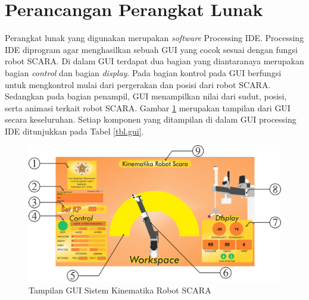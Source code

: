 \section{Perancangan Perangkat Lunak}
Perangkat lunak yang digunakan merupakan \textit{software} Processing IDE. Processing IDE diprogram agar menghasilkan sebuah GUI yang cocok sesuai dengan fungsi robot SCARA. Di dalam GUI terdapat dua bagian yang diantaranaya merupakan bagian \textit{control} dan bagian \textit{display}. Pada bagian kontrol pada GUI berfungsi untuk mengkontrol mulai dari pergerakan dan posisi dari robot SCARA. Sedangkan pada bagian penampil, GUI menampilkan nilai dari sudut, posisi, serta animasi terkait robot SCARA. Gambar \ref{pic.gui} merupakan tampilan dari GUI secara keseluruhan. Setiap komponen yang ditampilan di dalam GUI processing IDE ditunjukkan pada Tabel \ref{tbl.gui}.
\begin{figure}[H]
	\centering
	\includegraphics[width=15cm ]{gambar/GUI.png}
	\caption{Tampilan GUI Sistem Kinematika Robot SCARA}
	\label{pic.gui}
\end{figure}

